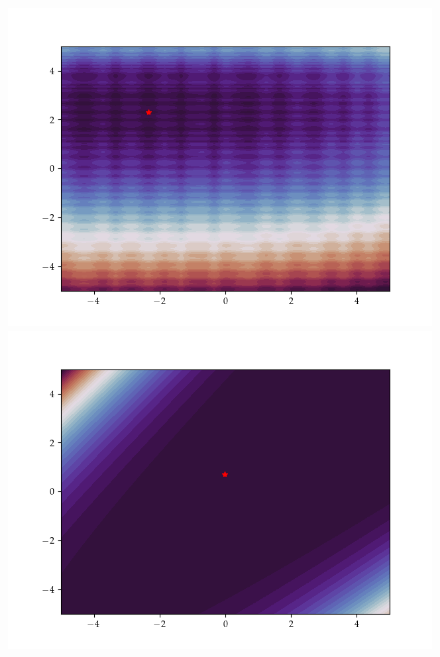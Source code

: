 \begin{figure}[h]
  \centering
  \begin{minipage}[b]{0.24\textwidth}
   \includegraphics[trim=2.5cm 1.3cm 2.5cm 1.3cm,clip,width=\textwidth]{Figures/coco/f3.png}
  \end{minipage}
  \hfill
  \begin{minipage}[b]{0.24\textwidth}
   \includegraphics[trim=2.5cm 1.3cm 2.5cm 1.3cm,clip,width=\textwidth]{Figures/coco/f9.png}
  \end{minipage}
  \hfill
  \begin{minipage}[b]{0.24\textwidth}

\end{minipage}
\end{figure}
